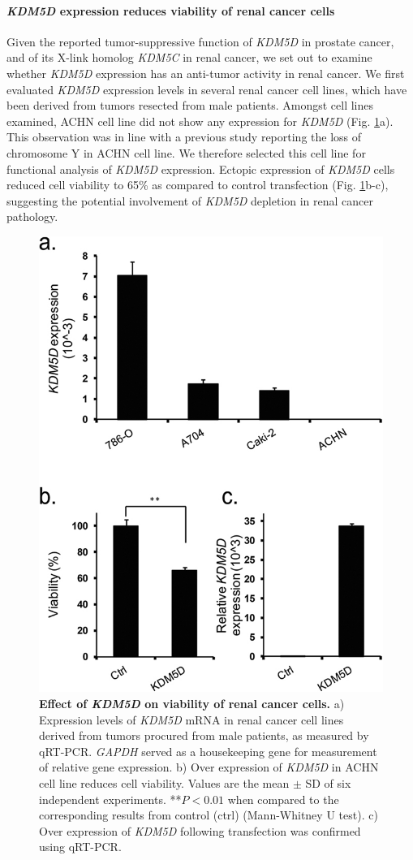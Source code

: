 \paragraph{{\it KDM5D} expression reduces viability of renal cancer cells}

Given the reported tumor-suppressive function of {\it KDM5D} in prostate cancer\cite{Jangravi2015}, and of its X-link homolog {\it KDM5C} in renal cancer\cite{Rondinelli2015}, we set out to examine whether {\it KDM5D} expression has an anti-tumor activity in renal cancer.
We first evaluated {\it KDM5D} expression levels in several renal cancer cell lines, which have been derived from tumors resected from male patients.
Amongst cell lines examined, ACHN cell line did not show any expression for {\it KDM5D} (Fig. \ref{fig:loy4}a).
This observation was in line with a previous study reporting the loss of chromosome Y in ACHN cell line\cite{DuManoir1993}.
We therefore selected this cell line for functional analysis of {\it KDM5D} expression.
Ectopic expression of {\it KDM5D} cells reduced cell viability to 65\% as compared to control transfection (Fig. \ref{fig:loy4}b-c), suggesting the potential involvement of {\it KDM5D} depletion in renal cancer pathology.

\begin{figure}[ht]
  \centering
  \includegraphics[width=.5\linewidth]{figures/LOY-fig4.png}
  \caption[Effect of {\it KDM5D} on viability of renal cancer cells.]{{\bf Effect of {\it KDM5D} on viability of renal cancer cells.} {\small a) Expression levels of {\it KDM5D} mRNA in renal cancer cell lines derived from tumors procured from male patients, as measured by qRT-PCR.
{\it GAPDH} served as a housekeeping gene for measurement of relative gene expression.
b) Over expression of {\it KDM5D} in ACHN cell line reduces cell viability.
Values are the mean $\pm$ SD of six independent experiments.
**$P<0.01$ when compared to the corresponding results from control (ctrl) (Mann-Whitney U test).
c) Over expression of {\it KDM5D} following transfection was confirmed using qRT-PCR.}}
  \label{fig:loy4}
\end{figure}

